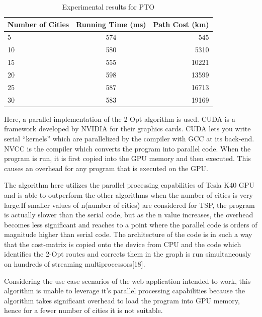 \documentclass[conference]{IEEEtran}
\begin{document}
\begin{table}[h!]
  \begin{center}
    \label{tab:table3} \caption{Experimental results for PTO}
    \begin{tabular}{l|c|r}
      \textbf{Number of Cities} & \textbf{Running Time (ms)} & \textbf{Path Cost (km)}\\
      \hline
      5 & 574 & 545\\
      10 & 580 & 5310\\
      15 & 555 & 10221\\
      20 & 598 & 13599\\ 
      25 & 587 & 16713\\
      30 & 583 & 19169\\
    \end{tabular}
  \end{center}
\end{table}



Here, a parallel implementation of the 2-Opt algorithm is used. CUDA is a framework developed by NVIDIA for their graphics cards. CUDA lets you write serial “kernels” which are parallelized by the compiler with GCC at its back-end. NVCC is the compiler which converts the program into parallel code. When the program is run, it is first copied into the GPU memory and then executed. This causes an overhead for any program that is executed on the GPU. 

 The algorithm here utilizes the parallel processing capabilities of Tesla K40 GPU and is able to outperform the other algorithms when the number of cities is very large.If smaller values of n(number of cities) are considered for TSP, the program is actually slower than the serial code, but as the n value increases, the overhead becomes less significant and reaches to a point where the parallel code is orders of magnitude higher than serial code. The architecture of the code is in such a way that the cost-matrix is copied onto the device from CPU and the code which identifies the 2-Opt routes and corrects them in the graph is run simultaneously on hundreds of streaming multiprocessors[18]. 

 Considering the use case scenarios of the web application intended to work, this algorithm is unable to leverage it’s parallel processing capabilities because the algorithm takes significant overhead to load the program into GPU memory, hence for a fewer number of cities it is not suitable.
\end{document}
